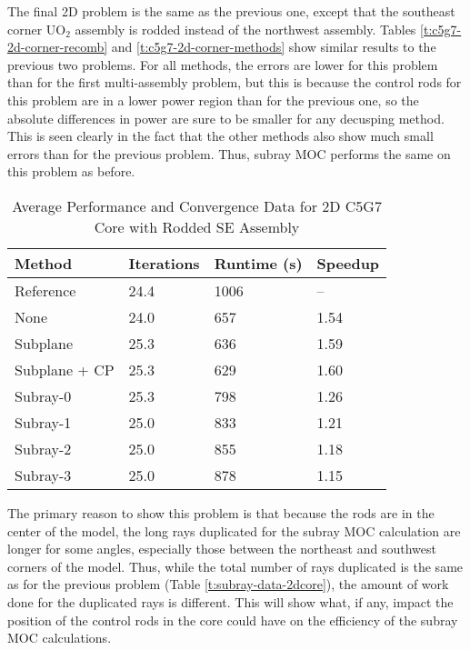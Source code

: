 The final 2D problem is the same as the previous one, except that the southeast corner UO$_2$ assembly is rodded instead of the northwest assembly.  Tables \ref{t:c5g7-2d-corner-recomb} and \ref{t:c5g7-2d-corner-methods} show similar results to the previous two problems.  For all methods, the errors are lower for this problem than for the first multi-assembly problem, but this is because the control rods for this problem are in a lower power region than for the previous one, so the absolute differences in power are sure to be smaller for any decusping method.  This is seen clearly in the fact that the other methods also show much small errors than for the previous problem.  Thus, subray MOC performs the same on this problem as before.

\begin{table}[h]
    \centering
    \caption[2D C5G7 Core Performance Data, Corner Assembly]{Average Performance and Convergence Data for 2D C5G7 Core with Rodded SE Assembly}\label{t:subray-performance-2dcoreSE}
    \begin{tabular}{l l l l}\toprule
        Method & Iterations & Runtime (s) & Speedup \\\midrule
Reference     & 24.4 & 1006 & --  \\
None          & 24.0 & 657 & 1.54 \\
Subplane      & 25.3 & 636 & 1.59 \\
Subplane + CP & 25.3 & 629 & 1.60 \\
Subray-0      & 25.3 & 798 & 1.26 \\
Subray-1      & 25.0 & 833 & 1.21 \\
Subray-2      & 25.0 & 855 & 1.18 \\
Subray-3      & 25.0 & 878 & 1.15 \\
        \bottomrule
    \end{tabular}
\end{table}

The primary reason to show this problem is that because the rods are in the center of the model, the long rays duplicated for the subray MOC calculation are longer for some angles, especially those between the northeast and southwest corners of the model.  Thus, while the total number of rays duplicated is the same as for the previous problem (Table \ref{t:subray-data-2dcore}), the amount of work done for the duplicated rays is different.  This will show what, if any, impact the position of the control rods in the core could have on the efficiency of the subray MOC calculations.

